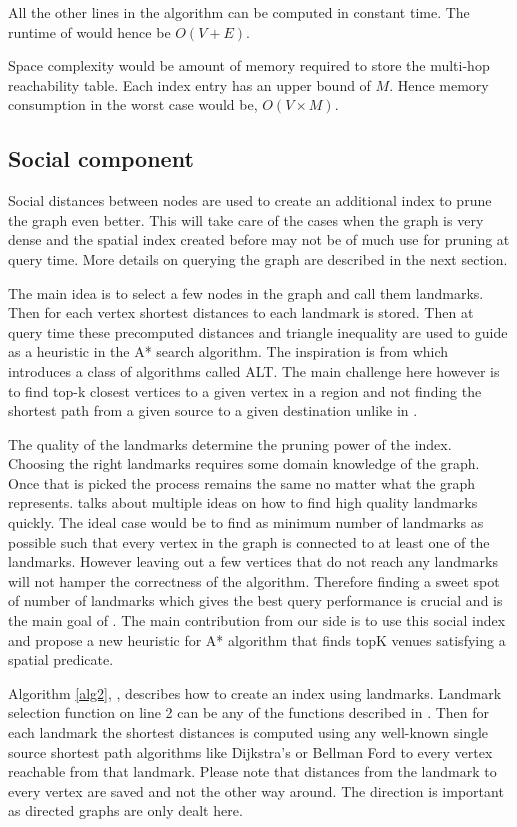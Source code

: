 All the other lines in the algorithm can be computed in constant time. The runtime of {\rrpspatial} would hence be $O(V + E)$.

Space complexity would be amount of memory required to store the multi-hop reachability table. Each index entry has an upper bound of $M$. Hence memory consumption in the worst case would be, $O(V \times M)$.

\subsection{Social component}
Social distances between nodes are used to create an additional index to prune the graph even better. This will take care of the cases when the graph is very dense and the spatial index created before may not be of much use for pruning at query time. More details on querying the graph are described in the next section.

The main idea is to select a few nodes in the graph and call them landmarks. Then for each vertex shortest distances to each landmark is stored. Then at query time these precomputed distances and triangle inequality are used to guide as a heuristic in the A* search algorithm. The inspiration is from \cite{AC2005} which introduces a class of algorithms called ALT. The main challenge here however is to find top-k closest vertices to a given vertex in a region and not finding the shortest path from a given source to a given destination unlike in \cite{AC2005}.

The quality of the landmarks determine the pruning power of the index. Choosing the right landmarks requires some domain knowledge of the graph. Once that is picked the process remains the same no matter what the graph represents. \cite{AC2005} talks about multiple ideas on how to find high quality landmarks quickly. The ideal case would be to find as minimum number of landmarks as possible such that every vertex in the graph is connected to at least one of the landmarks.  However leaving out a few vertices that do not reach any landmarks will not hamper the correctness of the algorithm. Therefore finding a sweet spot of number of landmarks which gives the best query performance is crucial and is the main goal of \cite{AC2005}. The main contribution from our side is to use this social index and propose a new heuristic for A* algorithm that finds topK venues satisfying a spatial predicate.

Algorithm \ref{alg2}, {\rrpsocial}, describes how to create an index using landmarks. Landmark selection function on line 2 can be any of the functions described in \cite{AC2005}. Then for each landmark the shortest distances is computed using any well-known single source shortest path algorithms like Dijkstra's or Bellman Ford to every vertex reachable from that landmark. Please note that distances from the landmark to every vertex are saved and not the other way around. The direction is important as directed graphs are only dealt here.

